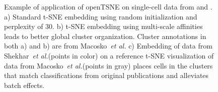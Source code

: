 \documentclass{bioinfo}
\def\etal{{\em et al.}\xspace}
\begin{document}
\begin{figure}[htbp]
\caption{Example of application of openTSNE on single-cell data from \citet{Macosko2015} and \citet{Shekhar2016}. a) Standard t-SNE embedding using random initialization and perplexity of 30. b) t-SNE embedding using multi-scale affinities leads to better global cluster organization. Cluster annotations in both a) and b) are from Macosko~\etal c) Embedding of data from Shekhar~\etal (points in color) on a reference t-SNE visualization of data from Macosko~\etal (points in gray) places cells in the clusters that match classifications from original publications and alleviates batch effects.}
\label{fig:tsne}
\end{figure}
\end{document}
